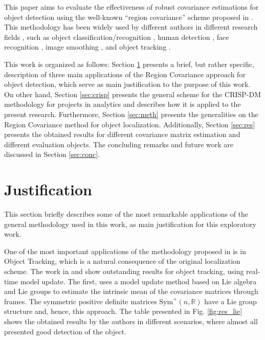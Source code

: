 \documentclass[11pt]{article}
\theoremstyle{definition}
\theoremstyle{remark}
\theoremstyle{remark}
\theoremstyle{remark}
\begin{document}
This paper aims to evaluate the effectiveness of robust covariance estimations
for object detection using the well-known ``region covariance'' scheme proposed
in \parencite{tuzel2006}. This methodology has been widely used by different
authors in different research fields \cite{wu2012real}, such as object
classification/recognition
\parencite{hong2009sigma,sivalingam2010tensor,tosato2010multi}, human detection
\parencite{paisitkriangkrai2008fast,tuzel2007human,yao2007fast,hirzer2011person},
face recognition \cite{pang2008gabor,hariri20163d}, image smoothing
\parencite{karacan2013structure}, and object tracking
\parencite{porikli2006covariance,wu2008probabilistic,wu2009real,wu2009robust}.

This work is organized as follows: Section \ref{sec:just} presents a brief, but
rather specific, description of three main applications of the Region Covariance
approach for object detection, which serve as main justification to the purpose
of this work. On other hand, Section \ref{sec:crisp} presents the general scheme
for the CRISP-DM methodology for projects in analytics and describes how it is
applied to the present research. Furthermore, Section \ref{sec:meth} presents
the generalities on the Region Covariance method for object localization.
Additionally, Section \ref{sec:res} presents the obtained results for different
covariance matrix estimation and different evaluation objects. The concluding
remarks and future work are discussed in Section \ref{sec:conc}.

\section{Justification}\label{sec:just}
This section briefly describes some of the most remarkable applications of the
general methodology used in this work, as main justification for this
exploratory work.

One of the most important applications of the methodology proposed in
\parencite{tuzel2006} is in Object Tracking, which is a natural consequence of
the original localization scheme. The work in \parencite{porikli2006covariance}
and \parencite{wu2012real} show outstanding results for object tracking, using
real-time model update. The first, uses a model update method based on Lie
algebra and Lie groups to estimate the intrinsic mean of the covariance matrices
through frames. The symmetric positive definite matrices
$\mathrm{Sym}^+(n,\mathbb{R})$ have a Lie group structure and, hence, this
approach. The table presented in Fig. \ref{fig:res_lie} shows the obtained
results by the authors in different scenarios, where almost all presented good
detection of the object.
\end{document}
